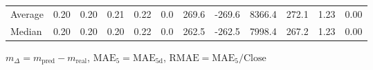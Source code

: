 \begin{threeparttable}
{\begin{tabular}{lrrrrrrrrrrr}
Average &          0.20 &          0.20 &          0.21 &        0.22 &                 0.0 &               269.6 &     -269.6 &              8366.4 &            272.1 &            1.23 &                   0.00 \\
 Median &          0.20 &          0.20 &          0.20 &        0.22 &                 0.0 &               262.5 &     -262.5 &              7998.4 &            267.2 &            1.23 &                   0.00 \\
\bottomrule
\end{tabular}
}
\begin{tablenotes}\footnotesize
\item $m_\Delta=m_{\text{pred}}-m_{\text{real}}$,
$\mathrm{MAE}_5=\mathrm{MAE}_{5\text{d}}$,
$\mathrm{RMAE}=\mathrm{MAE}_5/\text{Close}$
\end{tablenotes}
\end{threeparttable}
\endgroup

